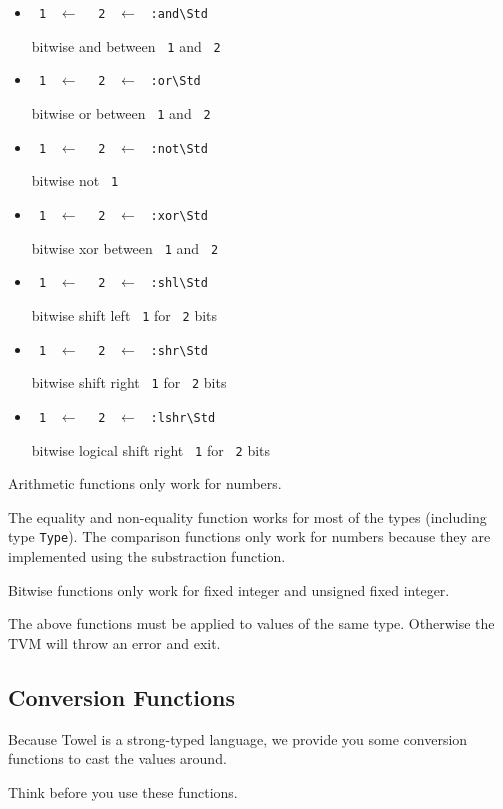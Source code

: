 \documentclass{report}
\newcommand{\mstd}[1]{\texttt{#1\textbackslash Std}}
\newcommand{\mtilde}[1]{\textasciitilde}
\newcommand{\marg}[1]{\texttt{\mtilde ~#1}}
\newcommand{\mla}[0]{~$\leftarrow$ ~}
\newcommand{\arithstd}[1]{\marg{1} \mla \marg{2} \mla \mstd{#1}}
\begin{document}
\begin{itemize}
\item \arithstd{:and}

bitwise and between \marg1 and \marg2
\item \arithstd{:or}

bitwise or between \marg1 and \marg2
\item \arithstd{:not}

bitwise not \marg1
\item \arithstd{:xor}

bitwise xor between \marg1 and \marg2
\item \arithstd{:shl}

bitwise shift left \marg1 for \marg2 bits
\item \arithstd{:shr}

bitwise shift right \marg1 for \marg2 bits
\item \arithstd{:lshr}

bitwise logical shift right \marg1 for \marg2 bits
\end{itemize}

\begin{mdframed}[style=hint]
  Arithmetic functions only work for numbers.

  The equality and non-equality function works for most of the types (including type \texttt{Type}).
  The comparison functions only work for numbers because they are implemented using the substraction function.

  Bitwise functions only work for fixed integer and unsigned fixed integer.
\end{mdframed}

\begin{mdframed}[style=hint]
  The above functions must be applied to values of the same type. Otherwise the TVM will throw an error and exit.
\end{mdframed}

\subsection{Conversion Functions}

Because Towel is a strong-typed language, we provide you some conversion functions to cast the values around.

\begin{mdframed}[style=warning]
  Think before you use these functions.
\end{mdframed}
\end{document}
